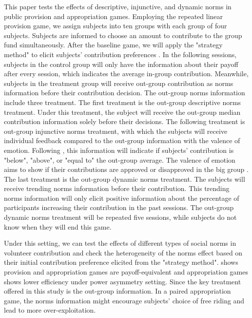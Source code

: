 \documentclass[12pt]{article}
\begin{document}
This paper tests the effects of descriptive, injunctive, and dynamic norms in public provision and appropriation games. Employing the repeated linear provision game, we assign subjects into ten groups with each group of four subjects. Subjects are informed to choose an amount to contribute to the group fund simultaneously. After the baseline game, we will apply the "strategy method" to elicit subjects' contribution preferences \citep{fischbacher2001people}. In the following sessions, subjects in the control group will only have the information about their payoff after every session, which indicates the average in-group contribution.
Meanwhile, subjects in the treatment group will receive out-group contribution as norms information before their contribution decision. The out-group norms information include three treatment. The first treatment is the out-group descriptive norms treatment. Under this treatment, the subject will receive the out-group median contribution information solely before their decisions. The following treatment is out-group injunctive norms treatment, with which the subjects will receive individual feedback compared to the out-group information with the valence of emotion. Following \cite{kandul2021public}, this information will indicate if subjects' contribution is "below", "above", or "equal to" the out-group average. The valence of emotion aims to show if their contributions are approved or disapproved in the big group \citep{schultz2007constructive, allcott2011social}. The last treatment is the out-group dynamic norms treatment. The subjects will receive trending norms information before their contribution. This trending norms information will only elicit positive information about the percentage of participants increasing their contribution in the past sessions. The out-group dynamic norms treatment will be repeated five sessions, while subjects do not know when they will end this game. 

Under this setting, we can test the effects of different types of social norms in volunteer contribution and check the heterogeneity of the norms effect based on their initial contribution preference elicited from the "strategy method". \cite{cox2013provision} shows provision and appropriation games are payoff-equivalent and appropriation games shows lower efficiency under power asymmetry setting. Since the key treatment offered in this study is the out-group information. In a paired appropriation game, the norms information might encourage subjects' choice of free riding and lead to more over-exploitation. 
\end{document}
